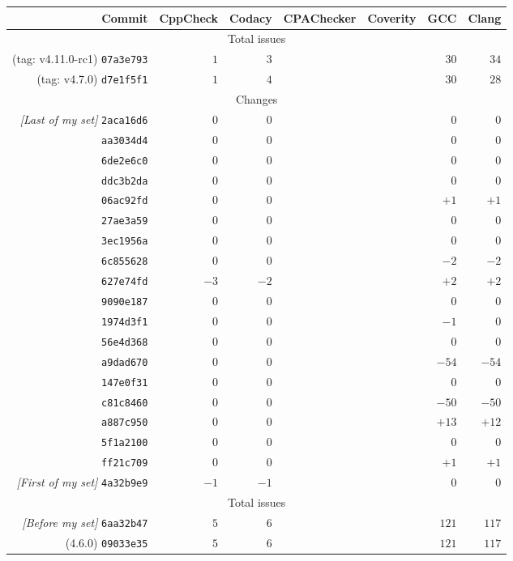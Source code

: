 \begin{table}[h]
\begin{tabular}{|r||r|r|r|r|r|r|}
\hline
Commit & CppCheck & Codacy & CPAChecker & Coverity & GCC & Clang \\
\hline
\hline
\multicolumn{7}{|c|}{Total issues}\\
\hline
(tag: v4.11.0-rc1) {\tt 07a3e793} & $1$ & $3$ & & & $30$ & $34$ \\
\hline
(tag: v4.7.0) {\tt d7e1f5f1} & $1$ & $4$ & & & $30$ & $28$ \\
\hline
\hline
\multicolumn{7}{|c|}{Changes}\\
\hline
{\em [Last of my set]} {\tt 2aca16d6} & 0 & 0 & & & 0 & 0 \\
\hline
{\tt aa3034d4} & 0 & 0 & & & 0 & 0 \\
\hline
{\tt 6de2e6c0} & 0 & 0 & & & 0 & 0 \\
\hline
{\tt ddc3b2da} & 0 & 0 & & & 0 & 0\\
\hline
{\tt 06ac92fd} & 0 & 0 & & & $+1$ & $+1$\\
\hline
{\tt 27ae3a59} & 0 & 0 & & & 0 & 0 \\
\hline
{\tt 3ec1956a} & 0 & 0 & & & 0 & 0 \\
\hline
{\tt 6c855628} & 0 & 0 & & & $-2$ & $-2$ \\
\hline
{\tt 627e74fd} & $-3$ & $-2$ & & & $+2$ & $+2$ \\
\hline
{\tt 9090e187} & 0 & 0 & & & 0 & 0 \\
\hline
{\tt 1974d3f1} & 0 & 0 & & & $-1$ & 0 \\
\hline
{\tt 56e4d368} & 0 & 0 & & & 0 & 0 \\
\hline
{\tt a9dad670} & 0 & 0 & & & $-54$ & $-54$ \\
\hline
{\tt 147e0f31} & 0 & 0 & & & 0 & 0 \\
\hline
{\tt c81c8460} & 0 & 0 & & & $-50$ & $-50$ \\
\hline
{\tt a887c950} & 0 & 0 & & & $+13$ & $+12$ \\
\hline
{\tt 5f1a2100} & 0 & 0 & & & 0 & 0 \\
\hline
{\tt ff21c709} & 0 & 0 & & & $+1$ & $+1$ \\
\hline
{\em [First of my set]} {\tt 4a32b9e9} & $-1$ & $-1$ & & & 0 & 0 \\
\hline
\hline
\multicolumn{7}{|c|}{Total issues} \\
\hline
{\em [Before my set]} {\tt 6aa32b47} & $5$ & $6$ & & & $121$ & $117$ \\
\hline
(4.6.0) {\tt 09033e35} & $5$ & $6$ & & & $121$ & $117$ \\

\end{tabular}
\end{table}
